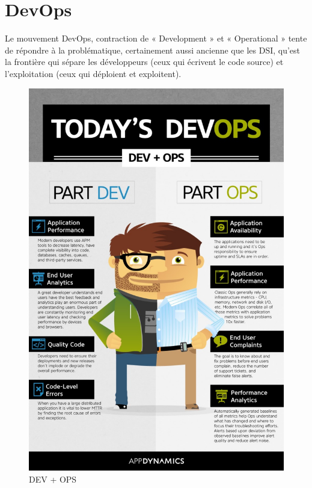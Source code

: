 \chapter{DevOps}
Le mouvement DevOps, contraction de « Development » et « Operational » tente de répondre à la problématique, certainement aussi ancienne que les DSI, qu’est la frontière qui sépare les développeurs (ceux qui écrivent le code source) et l’exploitation (ceux qui déploient et exploitent).\\

\begin{figure}
  \begin{center}
    \includegraphics[scale=1.5]{images/devops.png}
  \end{center}
  \caption{DEV + OPS}
  \label{Devops}
\end{figure}

